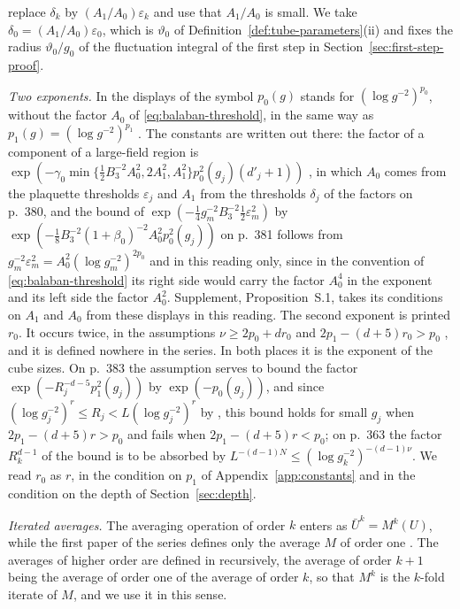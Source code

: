\documentclass[11pt]{preprint}
\numberwithin{equation}{section}
\theoremstyle{definition}
\theoremstyle{remark}
\theoremstyle{plain}
\begin{document}
\cite[p.~266]{BalabanCRE} replace $\delta_k$ by $(A_1/A_0)\varepsilon_k$ and use that $A_1/A_0$ is small. We take $\delta_0 = (A_1/A_0)\varepsilon_0$, which is $\vartheta_0$ of Definition~\ref{def:tube-parameters}(ii) and fixes the radius $\vartheta_0/g_0$ of the fluctuation integral of the first step in Section~\ref{sec:first-step-proof}.

\emph{Two exponents.} In the displays of \cite[pp.~380--383]{BalabanLFR2} the symbol $p_0(g)$ stands for $(\log g^{-2})^{p_0}$, without the factor $A_0$ of \eqref{eq:balaban-threshold}, in the same way as $p_1(g) = (\log g^{-2})^{p_1}$ \cite[p.~183]{BalabanLFR1}. The constants are written out there: the factor of a component of a large-field region is $\exp(-\gamma_0\min\{\frac12B_3^{-2}A_0^2, 2A_1^2, A_1^2\}p_0^2(g_j)(d'_j + 1))$ \cite[p.~381]{BalabanLFR2}, in which $A_0$ comes from the plaquette thresholds $\varepsilon_j$ and $A_1$ from the thresholds $\delta_j$ of the factors on p.~380, and the bound of $\exp(-\frac14g_m^{-2}B_3^{-2}\frac12\varepsilon_m^2)$ by $\exp(-\frac18B_3^{-2}(1 + \beta_0)^{-2}A_0^2p_0^2(g_j))$ on p.~381 follows from $g_m^{-2}\varepsilon_m^2 = A_0^2(\log g_m^{-2})^{2p_0}$ and \cite[(2.7), p.~255]{BalabanCRE} in this reading only, since in the convention of \eqref{eq:balaban-threshold} its right side would carry the factor $A_0^4$ in the exponent and its left side the factor $A_0^2$. Supplement, Proposition~S.1, takes its conditions on $A_1$ and $A_0$ from these displays in this reading. The second exponent is printed $r_0$. It occurs twice, in the assumptions $\nu \geq 2p_0 + dr_0$ \cite[p.~363]{BalabanLFR2} and $2p_1 - (d + 5)r_0 > p_0$ \cite[p.~383]{BalabanLFR2}, and it is defined nowhere in the series. In both places it is the exponent of the cube sizes. On p.~383 the assumption serves to bound the factor $\exp(-R_j^{-d-5}p_1^2(g_j))$ by $\exp(-p_0(g_j))$, and since $(\log g_j^{-2})^r \leq R_j < L(\log g_j^{-2})^r$ by \cite[(2.5), p.~255]{BalabanCRE}, this bound holds for small $g_j$ when $2p_1 - (d + 5)r > p_0$ and fails when $2p_1 - (d + 5)r < p_0$; on p.~363 the factor $R_k^{d-1}$ of the bound is to be absorbed by $L^{-(d-1)N} \leq (\log g_k^{-2})^{-(d-1)\nu}$. We read $r_0$ as $r$, in the condition on $p_1$ of Appendix~\ref{app:constants} and in the condition on the depth of Section~\ref{sec:depth}.

\emph{Iterated averages.} The averaging operation of order $k$ enters \cite[(1.1), p.~260]{BalabanRG1} as $\bar U^k = M^k(U)$, while the first paper of the series defines only the average $M$ of order one \cite[(0.4), p.~253]{BalabanRG1}. The averages of higher order are defined in \cite[(43), p.~24]{BalabanAVG} recursively, the average of order $k + 1$ being the average of order one of the average of order $k$, so that $M^k$ is the $k$-fold iterate of $M$, and we use it in this sense.
\end{document}
